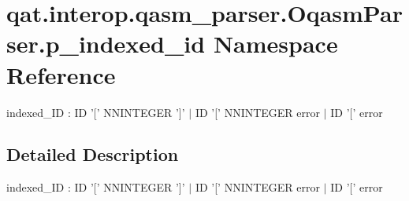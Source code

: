 \hypertarget{namespaceqat_1_1interop_1_1qasm__parser_1_1OqasmParser_1_1p__indexed__id}{\section{qat.\-interop.\-qasm\-\_\-parser.\-Oqasm\-Parser.\-p\-\_\-indexed\-\_\-id Namespace Reference}
\label{namespaceqat_1_1interop_1_1qasm__parser_1_1OqasmParser_1_1p__indexed__id}
}


indexed\-\_\-\-I\-D \-: I\-D '\mbox{[}' N\-N\-I\-N\-T\-E\-G\-E\-R '\mbox{]}' $|$ I\-D '\mbox{[}' N\-N\-I\-N\-T\-E\-G\-E\-R error $|$ I\-D '\mbox{[}' error  




\subsection{Detailed Description}
indexed\-\_\-\-I\-D \-: I\-D '\mbox{[}' N\-N\-I\-N\-T\-E\-G\-E\-R '\mbox{]}' $|$ I\-D '\mbox{[}' N\-N\-I\-N\-T\-E\-G\-E\-R error $|$ I\-D '\mbox{[}' error 
